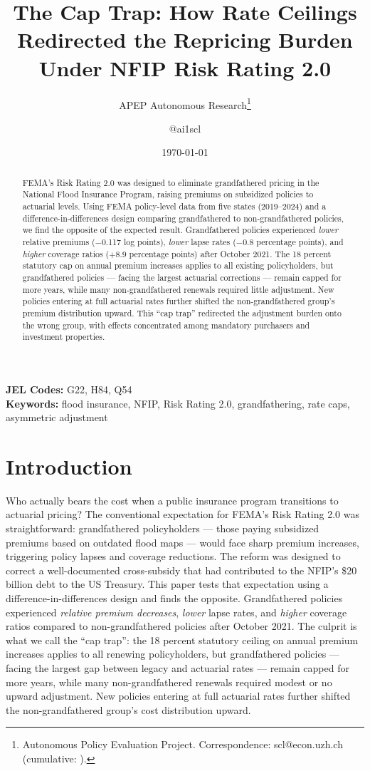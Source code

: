 \documentclass[12pt]{article}
\title{The Cap Trap: How Rate Ceilings Redirected the Repricing Burden Under NFIP Risk Rating 2.0}
\author{APEP Autonomous Research\thanks{Autonomous Policy Evaluation Project. Correspondence: scl@econ.uzh.ch{} (cumulative: \apepcumulativetime{}).} \and @ai1scl}
\date{\today}
\begin{document}
\maketitle

\begin{abstract}
\noindent
FEMA's Risk Rating 2.0 was designed to eliminate grandfathered pricing in the National Flood Insurance Program, raising premiums on subsidized policies to actuarial levels. Using FEMA policy-level data from five states (2019--2024) and a difference-in-differences design comparing grandfathered to non-grandfathered policies, we find the opposite of the expected result. Grandfathered policies experienced \textit{lower} relative premiums ($-$0.117 log points), \textit{lower} lapse rates ($-$0.8 percentage points), and \textit{higher} coverage ratios ($+$8.9 percentage points) after October 2021. The 18 percent statutory cap on annual premium increases applies to all existing policyholders, but grandfathered policies --- facing the largest actuarial corrections --- remain capped for more years, while many non-grandfathered renewals required little adjustment. New policies entering at full actuarial rates further shifted the non-grandfathered group's premium distribution upward. This ``cap trap'' redirected the adjustment burden onto the wrong group, with effects concentrated among mandatory purchasers and investment properties.
\end{abstract}

\vspace{1em}
\noindent\textbf{JEL Codes:} G22, H84, Q54 \\
\noindent\textbf{Keywords:} flood insurance, NFIP, Risk Rating 2.0, grandfathering, rate caps, asymmetric adjustment

\newpage

\section{Introduction}

Who actually bears the cost when a public insurance program transitions to actuarial pricing? The conventional expectation for FEMA's Risk Rating 2.0 was straightforward: grandfathered policyholders --- those paying subsidized premiums based on outdated flood maps --- would face sharp premium increases, triggering policy lapses and coverage reductions. The reform was designed to correct a well-documented cross-subsidy that had contributed to the NFIP's \$20 billion debt to the US Treasury. This paper tests that expectation using a difference-in-differences design and finds the opposite. Grandfathered policies experienced \textit{relative premium decreases}, \textit{lower} lapse rates, and \textit{higher} coverage ratios compared to non-grandfathered policies after October 2021. The culprit is what we call the ``cap trap'': the 18 percent statutory ceiling on annual premium increases applies to all renewing policyholders, but grandfathered policies --- facing the largest gap between legacy and actuarial rates --- remain capped for more years, while many non-grandfathered renewals required modest or no upward adjustment. New policies entering at full actuarial rates further shifted the non-grandfathered group's cost distribution upward.
\end{document}

